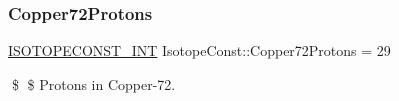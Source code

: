 \subsubsection{\texorpdfstring{Copper72\+Protons}{Copper72Protons}}
{\footnotesize\ttfamily \mbox{\hyperlink{group___isotope_const-_macros_ga5f18360b3e99483a35c32d789e62621c}{I\+S\+O\+T\+O\+P\+E\+C\+O\+N\+S\+T\+\_\+\+I\+NT}} Isotope\+Const\+::\+Copper72\+Protons = 29}

\$ \$ Protons in Copper-\/72. 